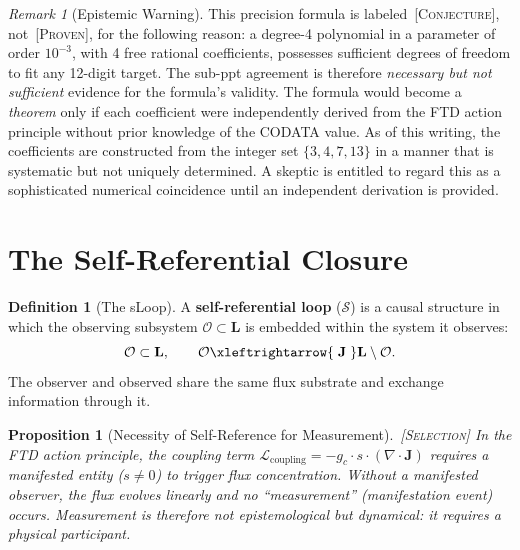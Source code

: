 \documentclass[11pt,twoside]{article}
\theoremstyle{definition}
\newtheorem{definition}[axiom]{Definition}
\theoremstyle{plain}
\newtheorem{proposition}[axiom]{Proposition}
\theoremstyle{remark}
\newtheorem{remark}[axiom]{Remark}
\newcommand{\etag}[1]{\,\textnormal{\textsc{\footnotesize[#1]}}}
\newcommand{\proven}{\etag{Proven}}
\newcommand{\selection}{\etag{Selection}}
\newcommand{\conject}{\etag{Conjecture}}
\newcommand{\Lattice}{\mathbf{L}}
\newcommand{\sLoop}{\mathcal{S}}
\begin{document}
\begin{remark}[Epistemic Warning]\label{rem:warning}
This precision formula is labeled \conject{}, not \proven{}, for the following reason: a degree-4 polynomial in a parameter of order $10^{-3}$, with 4 free rational coefficients, possesses sufficient degrees of freedom to fit any 12-digit target. The sub-ppt agreement is therefore \emph{necessary but not sufficient} evidence for the formula's validity. The formula would become a \emph{theorem} only if each coefficient were independently derived from the FTD action principle without prior knowledge of the CODATA value. As of this writing, the coefficients are constructed from the integer set $\{3, 4, 7, 13\}$ in a manner that is systematic but not uniquely determined. A skeptic is entitled to regard this as a sophisticated numerical coincidence until an independent derivation is provided.
\end{remark}

\section{The Self-Referential Closure}

\begin{definition}[The sLoop]\label{def:sloop}
A \textbf{self-referential loop} ($\sLoop$) is a causal structure in which the observing subsystem $\mathcal{O} \subset \Lattice$ is embedded within the system it observes:
\begin{equation}
    \mathcal{O} \subset \Lattice, \qquad \mathcal{O} \xleftrightarrow{\;\mathbf{J}\;} \Lattice \setminus \mathcal{O}.
\end{equation}
The observer and observed share the same flux substrate and exchange information through it.
\end{definition}

\begin{proposition}[Necessity of Self-Reference for Measurement]\label{prop:measurement}\selection
In the FTD action principle, the coupling term $\mathcal{L}_{\text{coupling}} = -g_c \cdot s \cdot (\nabla \cdot \mathbf{J})$ requires a manifested entity ($s \neq 0$) to trigger flux concentration. Without a manifested observer, the flux evolves linearly and no ``measurement'' (manifestation event) occurs. Measurement is therefore not epistemological but \emph{dynamical}: it requires a physical participant.
\end{proposition}
\end{document}
